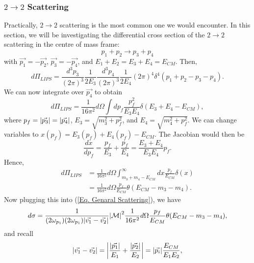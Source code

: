 \documentclass[11pt]{article}
\theoremstyle{definition}
\begin{document}
\subsubsection{$2\rightarrow2$ Scattering}
Practically, $2\rightarrow2$ scattering is the most common one we would encounter. In this section, we will be investigating the differential cross section of the $2 \rightarrow 2$ scattering in the centre of mass frame:
\begin{equation}
    p_1 + p_2 \rightarrow p_3 + p_4
\end{equation}
with $\vec{p_1} = -\vec{p_2}$, $\vec{p_3} = -\vec{p_4}$, and $E_1 +E_2 = E_3 + E_4 = E_{CM}$.
Then,
\begin{equation}
    d\Pi_{LIPS} = \frac{d^3p_3}{(2\pi)^3}\frac{1}{2E_{3}}\frac{d^3p_4}{(2\pi)^3}\frac{1}{2E_{4}}(2\pi)^4\delta^4(p_1+p_2-p_3-p_4).
\end{equation}
We can now integrate over $\vec{p_4}$ to obtain
\begin{equation}
    d\Pi_{LIPS} = \frac{1}{16\pi^2} d\Omega \int dp_f \frac{p_f^2}{E_3E_4}\delta(E_3 + E_4 - E_{CM}),
\end{equation}
where $p_f = \abs{\vec{p_3}}= \abs{\vec{p_4}}$, $E_3 = \sqrt{m_3^2 + p_f^2}$, and $E_4 = \sqrt{m_4^2 + p_f^2}$. We can change variables to $x(p_f) = E_3(p_f) + E_4(p_f) - E_{CM}$. The Jacobian would then be
\begin{equation}
    \frac{dx}{dp_f} = \frac{p_f}{E_3} + \frac{p_f}{E_4} = \frac{E_3 + E_4}{E_3E_4}p_f.
\end{equation}
Hence,
\begin{equation}
\begin{aligned}
        d\Pi_{LIPS} &=  \frac{1}{16\pi^2} d\Omega \int^\infty_{m_3+m_4-E_{CM}} dx \frac{p_f}{E_{CM}}\delta(x) \\
        &= \frac{1}{16\pi^2} d\Omega \frac{p_f}{E_{CM}} \theta(E_{CM}-m_3-m_4).
\end{aligned}
\end{equation}
Now plugging this into (\ref{Eq. Genaral Scattering}), we have
\begin{equation}
     d\sigma = \frac{1}{(2\omega_{p_1})(2\omega_{p_1})\abs{\vec{v_1} - \vec{v_2}}}\abs{\mathcal{M}}^2\frac{1}{16\pi^2} d\Omega \frac{p_f}{E_{CM}} \theta(E_{CM}-m_3-m_4),
\end{equation}
and recall
\begin{equation}
    \abs{\vec{v_1}-\vec{v_2}} = \abs{\frac{\abs{\vec{p_1}}}{E_1} + \frac{\abs{\vec{p_2}}}{E_2}} = \abs{\vec{p_i}}\frac{E_{CM}}{E_1E_2},
\end{equation}
\end{document}
